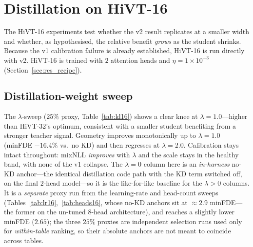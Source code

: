 \clearpage
\section{Distillation on HiVT-16}
\label{sec:res_kd16}

The HiVT-16 experiments test whether the v2 result replicates at a smaller width
and whether, as hypothesised, the relative benefit \emph{grows} as the student
shrinks. Because the v1 calibration failure is already established, HiVT-16 is run
directly with v2. HiVT-16 is trained with $2$ attention heads and 
$\eta=1\times10^{-3}$ (Section~\ref{sec:res_recipe}).

\subsection{Distillation-weight sweep}
The $\lambda$-sweep ($25\%$ proxy, Table~\ref{tab:kl16}) shows a clear knee at
$\lambda=1.0$---higher than HiVT-32's optimum, consistent with a smaller student
benefiting from a stronger teacher signal. Geometry improves monotonically up to
$\lambda=1.0$ (minFDE $-16.4\%$ vs.\ no KD) and then regresses at $\lambda=2.0$.
Calibration stays intact throughout: mixNLL \emph{improves} with $\lambda$ and the
scale stays in the healthy band, with none of the v1 collapse. The $\lambda{=}0$
column here is an \emph{in-harness} no-KD anchor---the identical distillation code
path with the KD term switched off, on the final $2$-head model---so it is the
like-for-like baseline for the $\lambda{>}0$ columns. It is a \emph{separate} proxy
run from the learning-rate and head-count sweeps (Tables~\ref{tab:lr16},~\ref{tab:heads16},
whose no-KD anchors sit at ${\approx}2.9$ minFDE---the former on the un-tuned $8$-head
architecture), and reaches a slightly lower minFDE ($2.65$); the three $25\%$ proxies
are independent selection runs used only for \emph{within-table} ranking, so their
absolute anchors are not meant to coincide across tables.

